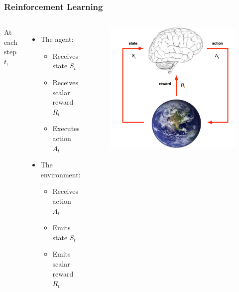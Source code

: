 \documentclass{beamer}
\begin{document}
\begin{frame}
\frametitle{Reinforcement Learning}
\begin{columns}[c] %

At each step $t$,
\begin{itemize}
\item  The agent:
   \begin{itemize}
   	\item Receives state $S_t$
	\item Receives scalar reward $R_t$
	\item Executes action $A_t$
      \end{itemize}
\item The environment:
   \begin{itemize}
   	\item Receives action $A_t$
	\item Emits state $S_t$
	\item Emits scalar reward $R_t$
      \end{itemize}
\end{itemize}

\begin{figure}[t]
\includegraphics[scale=0.2]{EarthBrain}
\centering
\end{figure}

\end{columns}
\end{frame}
\end{document}
